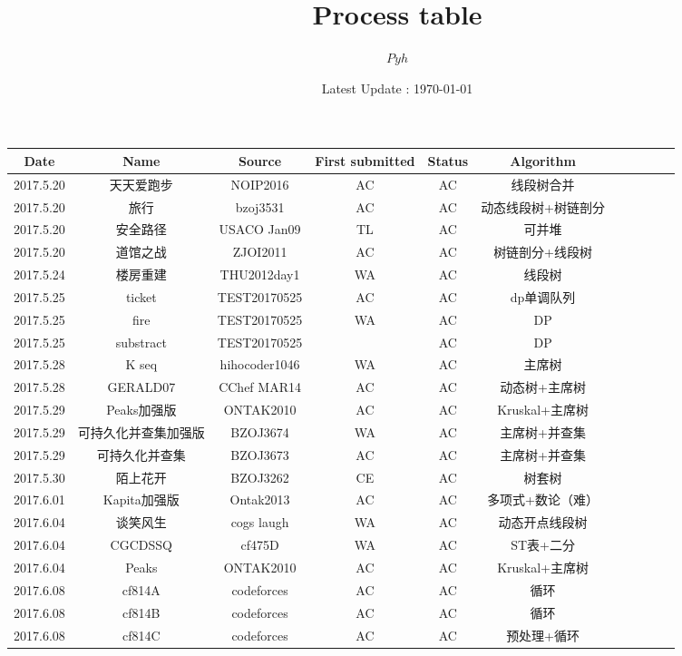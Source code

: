 \documentclass[landscape]{article}
\date{Latest Update : \today}
\title{Process table}
\author{$Pyh$}
\begin{document}
\maketitle

\begin{longtable}{ccccccccccc}
  \hline
  Date & Name & Source & First submitted & Status & Algorithm\\
  \hline
  2017.5.20 & 天天爱跑步 & NOIP2016 & AC & AC & 线段树合并\\
  \hline
  2017.5.20 & 旅行 & bzoj3531 & AC & AC & 动态线段树+树链剖分\\
  \hline
  2017.5.20 & 安全路径 & USACO Jan09 & TL & AC & 可并堆\\
  \hline
  2017.5.20 & 道馆之战 & ZJOI2011 & AC & AC & 树链剖分+线段树\\
  \hline
  2017.5.24 & 楼房重建 & THU2012day1 & WA & AC & 线段树\\
  \hline
  2017.5.25 & ticket & TEST20170525 & AC & AC & dp单调队列\\
  \hline
  2017.5.25 & fire & TEST20170525 & WA & AC & DP\\
  \hline
  2017.5.25 & substract & TEST20170525 & & AC & DP\\
  \hline
  2017.5.28 & K seq & hihocoder1046 & WA & AC & 主席树\\
  \hline
  2017.5.28 & GERALD07 & CChef MAR14 & AC & AC & 动态树+主席树\\
  \hline
  2017.5.29 & Peaks加强版 & ONTAK2010 & AC & AC & Kruskal+主席树\\
  \hline
  2017.5.29 & 可持久化并查集加强版 & BZOJ3674 & WA & AC & 主席树+并查集\\
  \hline
  2017.5.29 & 可持久化并查集 & BZOJ3673 & AC & AC & 主席树+并查集\\
  \hline
  2017.5.30 & 陌上花开 & BZOJ3262 & CE & AC & 树套树\\
  \hline
  2017.6.01 & Kapita加强版 & Ontak2013 & AC & AC & 多项式+数论（难）\\
  \hline
  2017.6.04 & 谈笑风生 & cogs laugh & WA & AC & 动态开点线段树\\
  \hline
  2017.6.04 & CGCDSSQ & cf475D & WA & AC & ST表+二分\\
  \hline
  2017.6.04 & Peaks & ONTAK2010 & AC & AC & Kruskal+主席树\\
  \hline
  2017.6.08 & cf814A & codeforces & AC & AC & 循环\\
  \hline
  2017.6.08 & cf814B & codeforces & AC & AC & 循环\\
  \hline
  2017.6.08 & cf814C & codeforces & AC & AC & 预处理+循环\\

\end{longtable}
\end{document}
